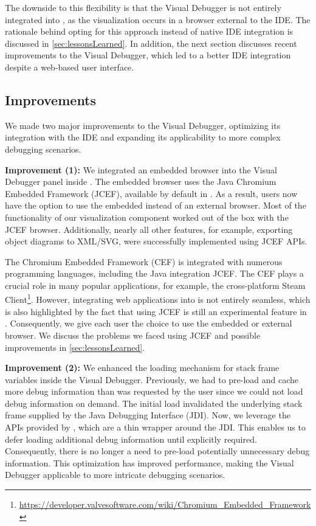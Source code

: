 \documentclass[sigconf]{acmart}
\begin{document}
The downside to this flexibility is that the Visual Debugger is not entirely integrated into \intellij{}, as the visualization occurs in a browser external to the IDE.
The rationale behind opting for this approach instead of native IDE integration is discussed in \autoref{sec:lessonsLearned}.
In addition, the next section discusses recent improvements to the Visual Debugger, which led to a better IDE integration despite a web-based user interface.

\subsection{Improvements} \label{subsec:improvements}
We made two major improvements to the Visual Debugger, optimizing its integration with the IDE and expanding its applicability to more complex debugging scenarios.

\textbf{Improvement (1):} We integrated an embedded browser into the Visual Debugger panel inside \intellij{}.
The embedded browser uses the Java Chromium Embedded Framework (JCEF), available by default in \intellij{}.
As a result, users now have the option to use the embedded instead of an external browser.
Most of the functionality of our visualization component worked out of the box with the JCEF browser.
Additionally, nearly all other features, for example, exporting object diagrams to XML/SVG, were successfully implemented using JCEF APIs.

The Chromium Embedded Framework (CEF) \cite{marshallgreenblattChromiumEmbeddedFramework2023} is integrated with numerous programming languages, including the Java integration JCEF.
The CEF plays a crucial role in many popular applications, for example, the cross-platform Steam Client\footnote{\url{https://developer.valvesoftware.com/wiki/Chromium_Embedded_Framework}}.
However, integrating web applications into \intellij{} is not entirely seamless, which is also highlighted by the fact that using JCEF is still an experimental feature in \intellij{}.
Consequently, we give each user the choice to use the embedded or external browser.
We discuss the problems we faced using JCEF and possible improvements in \autoref{sec:lessonsLearned}.

\textbf{Improvement (2):} We enhanced the loading mechanism for stack frame variables inside the Visual Debugger.
Previously, we had to pre-load and cache more debug information than was requested by the user since we could not load debug information on demand.
The initial load invalidated the underlying stack frame supplied by the Java Debugging Interface (JDI).
Now, we leverage the APIs provided by \intellij{}, which are a thin wrapper around the JDI.
This enables us to defer loading additional debug information until explicitly required.
Consequently, there is no longer a need to pre-load potentially unnecessary debug information.
This optimization has improved performance, making the Visual Debugger applicable to more intricate debugging scenarios.
\end{document}
